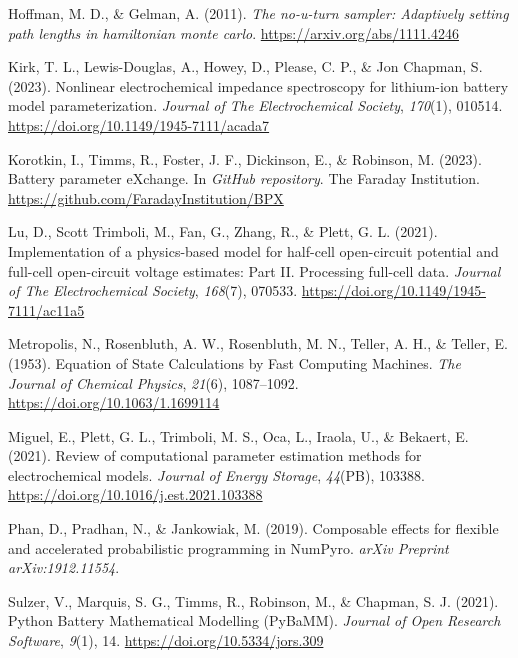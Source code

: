 \documentclass[
]{article}
\newlength{\cslhangindent}
\newenvironment{CSLReferences}[2] %
 {\begin{list}{}{%
  \setlength{\itemindent}{0pt}
  \setlength{\leftmargin}{0pt}
  \setlength{\parsep}{0pt}
  \ifodd #1
   \setlength{\leftmargin}{\cslhangindent}
   \setlength{\itemindent}{-1\cslhangindent}
  \fi
  \setlength{\itemsep}{#2\baselineskip}}}
 {\end{list}}
\begin{document}
\begin{CSLReferences}{1}{0}
Hoffman, M. D., \& Gelman, A. (2011). \emph{The no-u-turn sampler:
Adaptively setting path lengths in hamiltonian monte carlo}.
\url{https://arxiv.org/abs/1111.4246}

Kirk, T. L., Lewis-Douglas, A., Howey, D., Please, C. P., \& Jon
Chapman, S. (2023). Nonlinear electrochemical impedance spectroscopy for
lithium-ion battery model parameterization. \emph{Journal of The
Electrochemical Society}, \emph{170}(1), 010514.
\url{https://doi.org/10.1149/1945-7111/acada7}

Korotkin, I., Timms, R., Foster, J. F., Dickinson, E., \& Robinson, M.
(2023). Battery parameter eXchange. In \emph{GitHub repository}. The
Faraday Institution. \url{https://github.com/FaradayInstitution/BPX}

Lu, D., Scott Trimboli, M., Fan, G., Zhang, R., \& Plett, G. L. (2021).
Implementation of a physics-based model for half-cell open-circuit
potential and full-cell open-circuit voltage estimates: {P}art {II}.
Processing full-cell data. \emph{Journal of The Electrochemical
Society}, \emph{168}(7), 070533.
\url{https://doi.org/10.1149/1945-7111/ac11a5}

Metropolis, N., Rosenbluth, A. W., Rosenbluth, M. N., Teller, A. H., \&
Teller, E. (1953). Equation of {State} {Calculations} by {Fast}
{Computing} {Machines}. \emph{The Journal of Chemical Physics},
\emph{21}(6), 1087--1092. \url{https://doi.org/10.1063/1.1699114}

Miguel, E., Plett, G. L., Trimboli, M. S., Oca, L., Iraola, U., \&
Bekaert, E. (2021). Review of computational parameter estimation methods
for electrochemical models. \emph{Journal of Energy Storage},
\emph{44}(PB), 103388. \url{https://doi.org/10.1016/j.est.2021.103388}

Phan, D., Pradhan, N., \& Jankowiak, M. (2019). Composable effects for
flexible and accelerated probabilistic programming in NumPyro.
\emph{arXiv Preprint arXiv:1912.11554}.

Sulzer, V., Marquis, S. G., Timms, R., Robinson, M., \& Chapman, S. J.
(2021). {Python Battery Mathematical Modelling (PyBaMM)}. \emph{Journal
of Open Research Software}, \emph{9}(1), 14.
\url{https://doi.org/10.5334/jors.309}


\end{CSLReferences}
\end{document}
